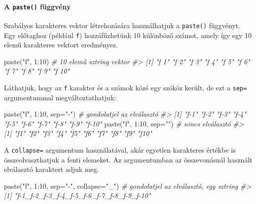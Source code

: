 \documentclass[
]{book}
\newenvironment{Shaded}{\begin{snugshade}}{\end{snugshade}}
\newcommand{\AttributeTok}[1]{\textcolor[rgb]{0.77,0.63,0.00}{#1}}
\newcommand{\CommentTok}[1]{\textcolor[rgb]{0.56,0.35,0.01}{\textit{#1}}}
\newcommand{\DecValTok}[1]{\textcolor[rgb]{0.00,0.00,0.81}{#1}}
\newcommand{\FunctionTok}[1]{\textcolor[rgb]{0.00,0.00,0.00}{#1}}
\newcommand{\NormalTok}[1]{#1}
\newcommand{\SpecialCharTok}[1]{\textcolor[rgb]{0.00,0.00,0.00}{#1}}
\newcommand{\StringTok}[1]{\textcolor[rgb]{0.31,0.60,0.02}{#1}}
\begin{document}
\hypertarget{a-paste-fuxfcggvuxe9ny}{%
\paragraph{\texorpdfstring{A \texttt{paste()} függvény}{A paste() függvény}}\label{a-paste-fuxfcggvuxe9ny}}

Szabályos karakteres vektor létrehozására használhatjuk a \texttt{paste()} függvényt. Egy előtaghoz (például \texttt{f}) hozzáfűzhetünk 10 különböző számot, amely így egy 10 elemű karakteres vektort eredményez.

\begin{Shaded}
\begin{Highlighting}[]
\FunctionTok{paste}\NormalTok{(}\StringTok{"f"}\NormalTok{, }\DecValTok{1}\SpecialCharTok{:}\DecValTok{10}\NormalTok{) }\CommentTok{\# 10 elemű sztring vektor}
\CommentTok{\#\textgreater{}  [1] "f 1"  "f 2"  "f 3"  "f 4"  "f 5"  "f 6"  "f 7"  "f 8"  "f 9"  "f 10"}
\end{Highlighting}
\end{Shaded}

Láthatjuk, hogy az \texttt{f} karakter és a számok közé egy szóköz került, de ezt a \texttt{sep=} argumentummal megváltoztathatjuk:

\begin{Shaded}
\begin{Highlighting}[]
\FunctionTok{paste}\NormalTok{(}\StringTok{"f"}\NormalTok{, }\DecValTok{1}\SpecialCharTok{:}\DecValTok{10}\NormalTok{, }\AttributeTok{sep=}\StringTok{"{-}"}\NormalTok{) }\CommentTok{\# gondolatjel az elválasztó}
\CommentTok{\#\textgreater{}  [1] "f{-}1"  "f{-}2"  "f{-}3"  "f{-}4"  "f{-}5"  "f{-}6"  "f{-}7"  "f{-}8"  "f{-}9"  "f{-}10"}
\FunctionTok{paste}\NormalTok{(}\StringTok{"f"}\NormalTok{, }\DecValTok{1}\SpecialCharTok{:}\DecValTok{10}\NormalTok{, }\AttributeTok{sep=}\StringTok{""}\NormalTok{)  }\CommentTok{\# nincs elválasztó}
\CommentTok{\#\textgreater{}  [1] "f1"  "f2"  "f3"  "f4"  "f5"  "f6"  "f7"  "f8"  "f9"  "f10"}
\end{Highlighting}
\end{Shaded}

A \texttt{collapse=} argumentum használatával, akár egyetlen karakteres értékbe is összeolvaszthatjuk a fenti elemeket. Az argumentumban az összevonásnál használt elválasztó karaktert adjuk meg.

\begin{Shaded}
\begin{Highlighting}[]
\FunctionTok{paste}\NormalTok{(}\StringTok{"f"}\NormalTok{, }\DecValTok{1}\SpecialCharTok{:}\DecValTok{10}\NormalTok{, }\AttributeTok{sep=}\StringTok{"{-}"}\NormalTok{, }\AttributeTok{collapse=}\StringTok{"\_"}\NormalTok{) }\CommentTok{\# gondolatjel az elválasztó, egy sztring}
\CommentTok{\#\textgreater{} [1] "f{-}1\_f{-}2\_f{-}3\_f{-}4\_f{-}5\_f{-}6\_f{-}7\_f{-}8\_f{-}9\_f{-}10"}
\end{Highlighting}
\end{Shaded}
\end{document}
